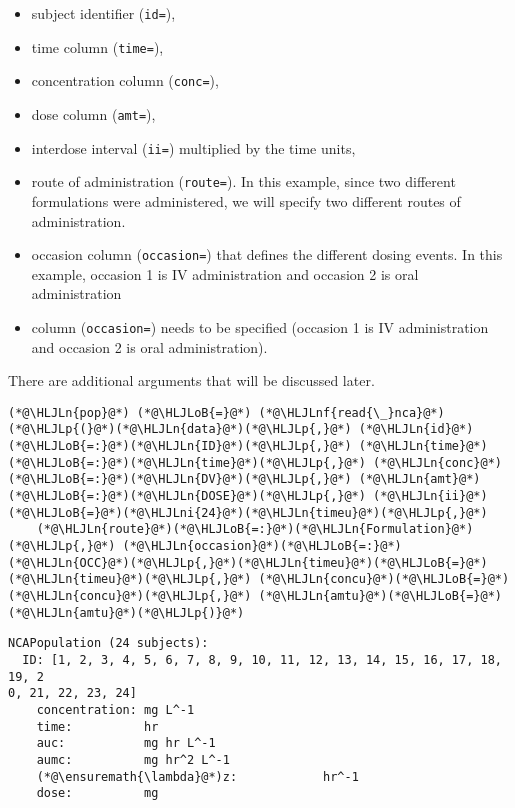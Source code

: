 \documentclass[12pt,a4paper]{article}
\newcommand{\HLJLn}[1]{#1}
\newcommand{\HLJLnf}[1]{\textcolor[RGB]{66,102,213}{#1}}
\newcommand{\HLJLni}[1]{\textcolor[RGB]{59,151,46}{#1}}
\newcommand{\HLJLoB}[1]{\textcolor[RGB]{102,102,102}{\textbf{#1}}}
\newcommand{\HLJLp}[1]{#1}
\begin{document}
\begin{itemize}
\item subject identifier (\texttt{id=}),


\item time column (\texttt{time=}),


\item concentration column (\texttt{conc=}),


\item dose column (\texttt{amt=}),


\item interdose interval (\texttt{ii=}) multiplied by the time units,


\item route of administration (\texttt{route=}). In this example, since two different formulations were administered, we will specify two different routes of administration.


\item occasion column (\texttt{occasion=}) that defines the different dosing events. In this example, occasion 1 is IV administration and occasion 2 is oral administration


\item column  (\texttt{occasion=}) needs to be specified (occasion 1 is IV administration and occasion 2 is oral administration).

\end{itemize}
There are additional arguments that will be discussed later.


\begin{lstlisting}
(*@\HLJLn{pop}@*) (*@\HLJLoB{=}@*) (*@\HLJLnf{read{\_}nca}@*)(*@\HLJLp{(}@*)(*@\HLJLn{data}@*)(*@\HLJLp{,}@*) (*@\HLJLn{id}@*)(*@\HLJLoB{=:}@*)(*@\HLJLn{ID}@*)(*@\HLJLp{,}@*) (*@\HLJLn{time}@*)(*@\HLJLoB{=:}@*)(*@\HLJLn{time}@*)(*@\HLJLp{,}@*) (*@\HLJLn{conc}@*)(*@\HLJLoB{=:}@*)(*@\HLJLn{DV}@*)(*@\HLJLp{,}@*) (*@\HLJLn{amt}@*)(*@\HLJLoB{=:}@*)(*@\HLJLn{DOSE}@*)(*@\HLJLp{,}@*) (*@\HLJLn{ii}@*)(*@\HLJLoB{=}@*)(*@\HLJLni{24}@*)(*@\HLJLn{timeu}@*)(*@\HLJLp{,}@*)
    (*@\HLJLn{route}@*)(*@\HLJLoB{=:}@*)(*@\HLJLn{Formulation}@*)(*@\HLJLp{,}@*) (*@\HLJLn{occasion}@*)(*@\HLJLoB{=:}@*)(*@\HLJLn{OCC}@*)(*@\HLJLp{,}@*)(*@\HLJLn{timeu}@*)(*@\HLJLoB{=}@*)(*@\HLJLn{timeu}@*)(*@\HLJLp{,}@*) (*@\HLJLn{concu}@*)(*@\HLJLoB{=}@*)(*@\HLJLn{concu}@*)(*@\HLJLp{,}@*) (*@\HLJLn{amtu}@*)(*@\HLJLoB{=}@*)(*@\HLJLn{amtu}@*)(*@\HLJLp{)}@*)
\end{lstlisting}

\begin{lstlisting}
NCAPopulation (24 subjects):
  ID: [1, 2, 3, 4, 5, 6, 7, 8, 9, 10, 11, 12, 13, 14, 15, 16, 17, 18, 19, 2
0, 21, 22, 23, 24]
    concentration: mg L^-1
    time:          hr
    auc:           mg hr L^-1
    aumc:          mg hr^2 L^-1
    (*@\ensuremath{\lambda}@*)z:            hr^-1
    dose:          mg
\end{lstlisting}
\end{document}
